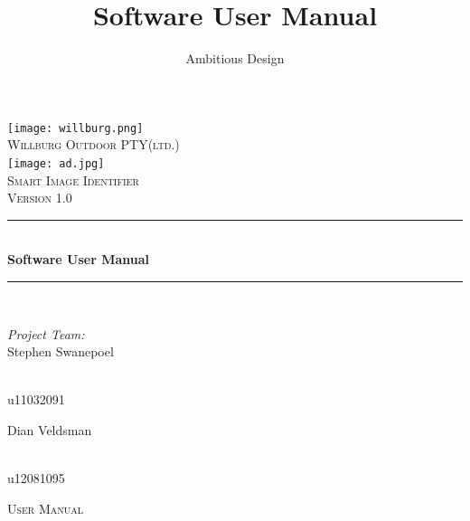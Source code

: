 \documentclass[a4paper,12pt]{report}
\author{Ambitious Design}
\title{ Software User Manual}
\newcommand{\HRule}{\rule{\linewidth}{0.5mm}}
\begin{document}
\setlength{\parskip}{6pt}

\begin{titlepage}

\begin{center}

\texttt{[image: willburg.png]}\\
\textsc{\LARGE Willburg Outdoor PTY(ltd.)}\\[1.5cm]

\texttt{[image: ad.jpg]}\\
\textsc{\Large Smart Image Identifier }\\[1.0cm]
\textsc{\Large Version 1.0 }\\[0.5cm]
\HRule \\[0.4cm]
{ \huge \bfseries  Software User Manual}\\[0.4cm]
\HRule \\[0.4cm]
\begin{minipage}{0.4\textwidth}
\begin{flushleft} \large
\emph{Project Team:}\\
Stephen {Swanepoel}
\end{flushleft}
\end{minipage}
\begin{minipage}{0.4\textwidth}
\begin{flushright} \large
\emph{} \\
u11032091
\end{flushright}
\end{minipage}
\begin{minipage}{0.4\textwidth}
\begin{flushleft} \large
Dian {Veldsman}
\end{flushleft}
\end{minipage}
\begin{minipage}{0.4\textwidth}
\begin{flushright} \large
\emph{} \\
u12081095
\end{flushright}
\end{minipage}

\end{center}
\end{titlepage}
\footnotesize
\normalsize

\renewcommand{\thesection}{\arabic{section}}
\newpage
\tableofcontents
\newpage

\begin{center}
\textsc{\LARGE User Manual}\\[1.5cm]
\end{center}
\end{document}
